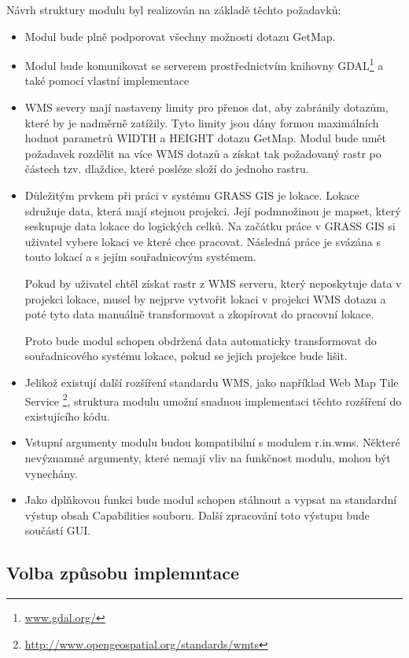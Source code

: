 \documentclass[a4paper,12pt]{article}
\begin{document}
Návrh struktury modulu byl realizován na základě těchto požadavků:
\begin{itemize}
  \item Modul bude plně podporovat všechny možnosti dotazu GetMap.
  \item Modul bude komunikovat se serverem prostřednictvím knihovny GDAL\footnote{\url{www.gdal.org/}}  a také pomocí vlastní implementace 
  \item WMS severy mají nastaveny limity pro přenos dat, aby zabránily dotazům, které by je nadměrně zatížily. Tyto limity jsou dány formou maximálních hodnot parametrů WIDTH a HEIGHT dotazu GetMap. 
        Modul bude umět požadavek rozdělit na více WMS dotazů a získat tak požadovaný rastr po částech tzv. dlaždice, které posléze složí do jednoho rastru.
  \item Důležitým prvkem při práci v systému GRASS GIS je lokace. Lokace sdružuje data, která mají stejnou projekci. Její podmnožinou je mapset, který seskupuje data lokace do logických celků. 
        Na začátku práce v GRASS GIS si uživatel vybere lokaci ve které chce pracovat. Následná práce je svázána s touto lokací a s  jejím souřadnicovým systémem.
 
        Pokud by uživatel chtěl získat rastr z WMS serveru, který neposkytuje data v projekci lokace,  musel by nejprve vytvořit lokaci v projekci WMS dotazu a poté tyto data
         manuálně transformovat a zkopírovat do pracovní lokace.
	
	Proto bude modul schopen obdržená data automaticky transformovat  do souřadnicového systému lokace, pokud se jejich projekce bude lišit. 
  \item Jelikož existují další rozšíření standardu WMS, jako například Web Map Tile Service \footnote{\url{http://www.opengeospatial.org/standards/wmts}}, struktura modulu umožní snadnou implementaci 
        těchto rozšíření do existujícího kódu. 
  \item Vstupní argumenty modulu budou kompatibilní s modulem r.in.wms. Některé nevýznamné argumenty, které nemají vliv na funkčnost modulu, mohou být vynechány.
  \item Jako dplňkovou funkci bude modul schopen stáhnout a vypsat na standardní výstup obsah Capabilities souboru. Další zpracování toto výstupu bude součástí GUI.  
 \end{itemize}



\subsection{Volba způsobu implemntace}
\end{document}
